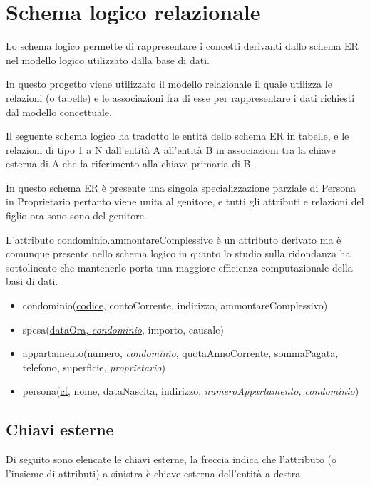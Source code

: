 \section{Schema logico relazionale}
\label{logico}

Lo schema logico permette di rappresentare i concetti derivanti dallo schema ER
nel modello logico utilizzato dalla base di dati.

In questo progetto viene utilizzato il modello relazionale il quale utilizza le relazioni
(o tabelle) e le associazioni fra di esse per rappresentare i dati richiesti dal modello
concettuale.

Il seguente schema logico ha tradotto le entità dello schema ER in tabelle, e le relazioni
di tipo 1 a N dall'entità A all'entità B in associazioni tra la chiave esterna di A che
fa riferimento alla chiave primaria di B.

In questo schema ER è presente una singola specializzazione parziale di Persona in
Proprietario pertanto viene unita al genitore, e tutti gli attributi e relazioni del figlio
ora sono sono del genitore.

L'attributo condominio.ammontareComplessivo è un attributo derivato ma è comunque presente
nello schema logico in quanto lo studio sulla ridondanza ha sottolineato che mantenerlo porta
una maggiore efficienza computazionale della basi di dati.

\begin{itemize}

\item condominio(\underline{codice}, contoCorrente, indirizzo, ammontareComplessivo)

\item spesa(\underline{dataOra, \textit{condominio}}, importo, causale)

\item appartamento(\underline{numero, \textit{condominio}}, quotaAnnoCorrente, sommaPagata, telefono, superficie, \textit{proprietario})

\item persona(\underline{cf}, nome, dataNascita, indirizzo, \textit{numeroAppartamento, condominio})

\end{itemize}

\subsection{Chiavi esterne}

Di seguito sono elencate le chiavi esterne, la freccia indica che l'attributo (o l'insieme di attributi)
a sinistra è chiave esterna dell'entità a destra

